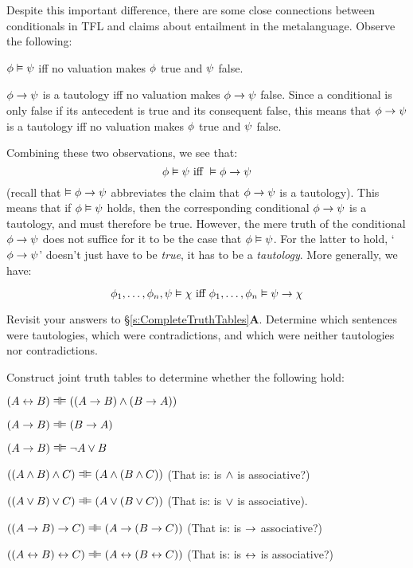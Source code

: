 Despite this important difference, there are some close connections between conditionals in TFL and claims about entailment in the metalanguage.  Observe the following:
\begin{ebullet}
\item $\mathcal{\phi} \vDash \mathcal{\psi}$ iff no valuation makes $\mathcal{\phi}$ true and $\mathcal{\psi}$ false.
\item $\mathcal{\phi} \rightarrow \mathcal{\psi}$ is a tautology iff no valuation  makes $\mathcal{\phi} \rightarrow \mathcal{\psi}$ false. Since a conditional is only false if its antecedent is true and its consequent false, this means that $\mathcal{\phi} \rightarrow \mathcal{\psi}$ is a tautology iff no valuation makes $\mathcal{\phi}$ true and $\mathcal{\psi}$ false.
\end{ebullet}
Combining these two observations, we see that:
$$\mathcal{\phi} \vDash \mathcal{\psi} \text{ iff } \vDash \mathcal{\phi} \rightarrow \mathcal{\psi}$$
(recall that $\vDash \mathcal{\phi} \rightarrow \mathcal{\psi}$ abbreviates the claim that $\mathcal{\phi} \rightarrow \mathcal{\psi}$ is a tautology). This means that if $\mathcal{\phi} \vDash \mathcal{\psi}$ holds, then the corresponding conditional $\mathcal{\phi} \rightarrow \mathcal{\psi}$ is a tautology, and must therefore be true.  However, the mere truth of the conditional $\mathcal{\phi} \rightarrow \mathcal{\psi}$ does not suffice for it to be the case that $\mathcal{\phi} \vDash \mathcal{\psi}$.  For the latter to hold, `$\mathcal{\phi} \rightarrow \mathcal{\psi}$' doesn't just have to be \emph{true}, it has to be a \emph{tautology}.  More generally, we have:

$$\mathcal{\phi}_1, \ldots, \mathcal{\phi}_n, \mathcal{\psi} \vDash \mathcal{\chi} \text{ iff } \mathcal{\phi}_1, \ldots, \mathcal{\phi}_n \vDash \mathcal{\psi} \rightarrow \mathcal{\chi}$$



\practiceproblems
\problempart
Revisit your answers to \S\ref{s:CompleteTruthTables}\textbf{A}. Determine which sentences were tautologies, which were contradictions, and which were neither tautologies nor contradictions.

\problempart
Construct joint truth tables to determine whether the following hold:
\begin{earg}
	\item $(A \eiff B) \lequiv ((A \eif B) \eand (B \eif A))$
	\item $(A \eif B) \lequiv (B \eif A)$
	\item $(A \eif B) \lequiv \enot A \eor B$
	\item $((A \eand B) \eand C) \lequiv (A \eand (B \eand C))$ (That is: is $\wedge$ is associative?)
	\item $((A \eor B) \eor C) \lequiv (A \eor (B \eor C))$ (That is: is $\vee$ is associative).
	\item $((A \eif B) \eif C) \lequiv (A \eif (B \eif C))$ (That is: is $\rightarrow$ associative?)
	\item $((A \eiff B) \eiff C) \lequiv (A \eiff (B \eiff C))$ (That is: is $\leftrightarrow$ is associative?)
\end{earg}


